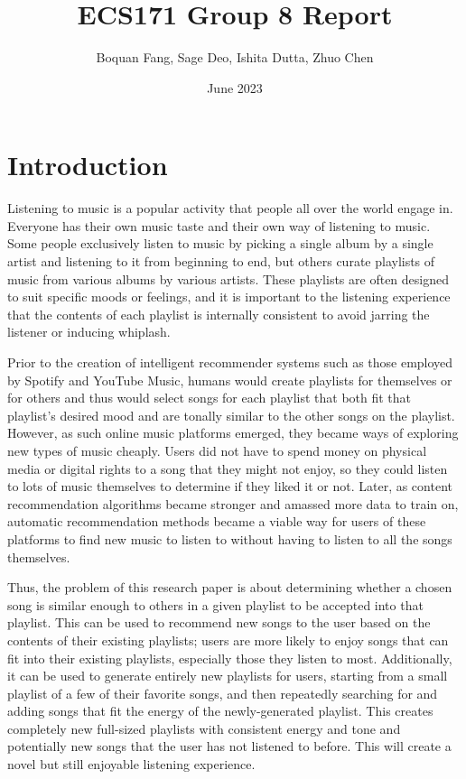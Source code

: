 \documentclass[titlepage]{article}
\title{ECS171 Group 8 Report}
\author{Boquan Fang, Sage Deo, Ishita Dutta, Zhuo Chen}
\date{June 2023}
\begin{document}
\maketitle



\section{Introduction}
Listening to music is a popular activity that people all over the world engage in. 
Everyone has their own music taste and their own way of listening to music.
Some people exclusively listen to music by picking a single album by a single artist 
and listening to it from beginning to end, but others curate playlists of music from
various albums by various artists. These playlists are often designed to suit specific
moods or feelings, and it is important to the listening experience that the contents of
each playlist is internally consistent to avoid jarring the listener or inducing whiplash.

Prior to the creation of intelligent recommender systems such as those employed by 
Spotify and YouTube Music, humans would create playlists for themselves or for others
and thus would select songs for each playlist that both fit that playlist's desired mood
and are tonally similar to the other songs on the playlist. However, as such 
online music platforms emerged, they became ways of exploring new types of music cheaply.
Users did not have to spend money on physical media or digital rights to a song that they
might not enjoy, so they could listen to lots of music themselves to determine if they liked it
or not. Later, as content recommendation algorithms became stronger and amassed more data
to train on, automatic recommendation methods became a viable way for users of these platforms
to find new music to listen to without having to listen to all the songs themselves. 

Thus, the problem of this research paper is about determining whether a chosen song is similar enough to others in a given playlist to be accepted into that playlist. This can be used to recommend new songs to the user based on the contents of their existing playlists; users are more likely
to enjoy songs that can fit into their existing playlists, especially those they listen to most.
Additionally, it can be used to generate entirely new playlists for users, starting from a small
playlist of a few of their favorite songs, and then repeatedly searching for and adding songs that
fit the energy of the newly-generated playlist. This creates completely new full-sized playlists 
with consistent energy and tone and potentially new songs that the user has not listened to before.
This will create a novel but still enjoyable listening experience. 
\end{document}
